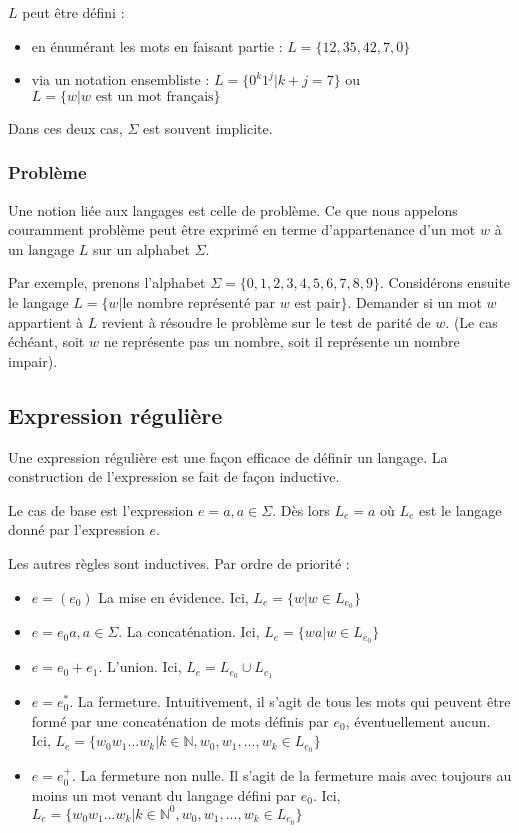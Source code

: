 	$L$ peut être défini  :
	\begin{itemize}
		\item en énumérant les mots en faisant partie : $L=\{12,35,42,7,0\}$
		\item via un notation ensembliste : $L=\{0^k1^j|k+j=7\}$ ou $L=\{w|w \text{ est un mot français}\}$
	\end{itemize}
	Dans ces deux cas, $\Sigma$ est souvent implicite.
	
	\subsubsection{Problème}
	Une notion liée aux langages est celle de problème. Ce que nous appelons couramment problème peut être exprimé en terme d'appartenance d'un mot $w$ à un langage $L$ sur un alphabet $\Sigma$.
	
	Par exemple, prenons l'alphabet $\Sigma=\{0,1,2,3,4,5,6,7,8,9\}$. Considérons ensuite le langage $L = \{w | \text{le nombre représenté par } w \text{ est pair}\}$.
	Demander si un mot $w$ appartient à $L$ revient à résoudre le problème sur le test de parité de $w$. (Le cas échéant, soit $w$ ne représente pas un nombre, soit il représente un nombre impair).
		
	\subsection{Expression régulière}
	
	Une expression régulière est une façon efficace de définir un langage. La construction de l'expression se fait de façon inductive.
	
	Le cas de base est l'expression $e = a, a \in \Sigma$. Dès lors $L_e = {a}$ où $L_e$ est le langage donné par l'expression $e$.
	
	Les autres règles sont inductives. Par ordre de priorité :
	\begin{itemize}
		\item $e = (e_0)$ La mise en évidence. Ici, $L_e = \{w|w \in L_{e_0}\}$
		\item $e = e_0a, a \in \Sigma$. La concaténation. Ici, $L_e = \{wa|w \in L_{e_0}\}$
		\item $e = e_0+e_1$. L'union. Ici, $L_e = L_{e_0} \cup L_{e_1}$
		\item $e = e_0^*$. La fermeture. Intuitivement, il s'agit de tous les mots qui peuvent être formé par une concaténation de mots définis par $e_0$, éventuellement aucun. Ici, $L_e = \{w_0w_1...w_k | k \in \mathbb{N}, w_0,w_1,...,w_k \in L_{e_0}\}$
		\item $e = e_0^+$. La fermeture non nulle. Il s'agit de la fermeture mais avec toujours au moins un mot venant du langage défini par $e_0$. Ici, $L_e = \{w_0w_1...w_k | k \in \mathbb{N}^0, w_0,w_1,...,w_k \in L_{e_0}\}$
	\end{itemize}
	
